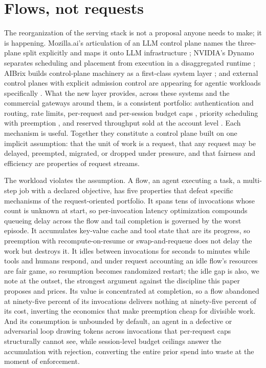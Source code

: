 \section{Flows, not requests}

The reorganization of the serving stack is not a proposal anyone needs to
make; it is happening. Mozilla.ai's articulation of an LLM control plane
names the three-plane split explicitly and maps it onto LLM
infrastructure \citep{mozilla2026}; NVIDIA's Dynamo separates scheduling and
placement from execution in a disaggregated runtime \citep{dynamo2025}; AIBrix
builds control-plane machinery as a first-class system layer
\citep{aibrix2025}; and external control planes with explicit admission control
are appearing for agentic workloads specifically \citep{mars2026}. What the new
layer provides, across these systems and the commercial gateways around
them, is a consistent portfolio: authentication and routing, rate limits,
per-request and per-session budget caps \citep{litellm2026,truefoundry2026},
priority scheduling with preemption \citep{vllm2023}, and reserved throughput
sold at the account level \citep{bedrock_ptu,azure_ptu}. Each mechanism is
useful. Together they constitute a control plane built on one implicit
assumption: that the unit of work is a request, that any request may be
delayed, preempted, migrated, or dropped under pressure, and that
fairness and efficiency are properties of request streams.

The workload violates the assumption. A flow, an agent executing a task,
a multi-step job with a declared objective, has five properties that
defeat specific mechanisms of the request-oriented portfolio. It spans
tens of invocations whose count is unknown at start, so per-invocation
latency optimization compounds queueing delay across the flow and tail
completion is governed by the worst episode. It accumulates key-value
cache and tool state that are its progress, so preemption with
recompute-on-resume or swap-and-requeue does not delay the work but
destroys it. It idles between invocations for seconds to minutes while
tools and humans respond, and under request accounting an idle flow's
resources are fair game, so resumption becomes randomized restart; the
idle gap is also, we note at the outset, the strongest argument against
the discipline this paper proposes and prices. Its value is concentrated
at completion, so a flow abandoned at ninety-five percent of its
invocations delivers nothing at ninety-five percent of its cost,
inverting the economics that make preemption cheap for divisible work.
And its consumption is unbounded by default, an agent in a defective or
adversarial loop drawing tokens across invocations that per-request caps
structurally cannot see, while session-level budget ceilings
\citep{litellm2026,truefoundry2026} answer the accumulation with rejection,
converting the entire prior spend into waste at the moment of
enforcement.

